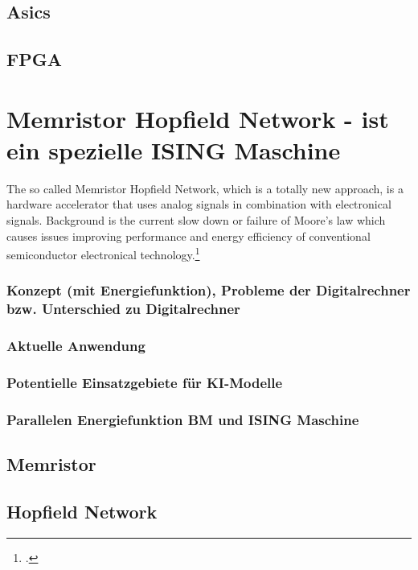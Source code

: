 \subsection{Asics}
\subsection{FPGA}
\section{Memristor Hopfield Network - ist ein spezielle ISING Maschine}

The so called Memristor Hopfield Network, which is a totally new approach, is a hardware accelerator that uses analog signals in combination with electronical signals.
Background is the current slow down or failure of Moore's law which causes issues improving performance and energy efficiency of conventional semiconductor electronical technology.\footcite[cf.][2]{zhouPhotonicMatrixMultiplication2022}

\subsubsection{Konzept (mit Energiefunktion), Probleme der Digitalrechner bzw. Unterschied zu Digitalrechner}
\subsubsection{Aktuelle Anwendung}
\subsubsection{Potentielle Einsatzgebiete für KI-Modelle}
\subsubsection{Parallelen Energiefunktion BM und ISING Maschine}
\subsection{Memristor}
\subsection{Hopfield Network}

